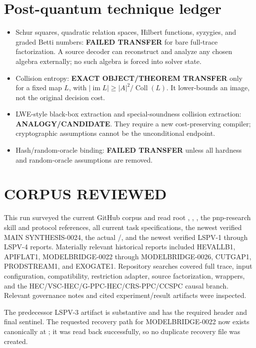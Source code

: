 \documentclass[11pt]{article}
\begin{document}
\section{Post-quantum technique ledger}
\begin{itemize}[leftmargin=*]
\item Schur squares, quadratic relation spaces, Hilbert functions, syzygies,
and graded Betti numbers: \textbf{FAILED TRANSFER} for bare full-trace
factorization.  A source decoder can reconstruct and analyze any chosen
algebra externally; no such algebra is forced into solver state.
\item Collision entropy: \textbf{EXACT OBJECT/THEOREM TRANSFER} only for a
fixed map $L$, with
$|\operatorname{im}L|\ge |A|^2/\operatorname{Coll}(L)$.  It lower-bounds an
image, not the original decision cost.
\item LWE-style black-box extraction and special-soundness collision
extraction: \textbf{ANALOGY/CANDIDATE}.  They require a new cost-preserving
compiler; cryptographic assumptions cannot be the unconditional endpoint.
\item Hash/random-oracle binding: \textbf{FAILED TRANSFER} unless all hardness
and random-oracle assumptions are removed.
\end{itemize}

\section{CORPUS REVIEWED}
This run surveyed the current GitHub corpus and read root ,
, , the pnp-research skill and protocol
references, all current task specifications, the newest verified MAIN
SYNTHESIS-0024, the actual /, and the newest
verified LSPV-1 through LSPV-4 reports.  Materially relevant historical reports
included HEVALLB1, APIFLAT1, MODELBRIDGE-0022 through MODELBRIDGE-0026, CUTGAP1,
PRODSTREAM1, and EXOGATE1.  Repository searches covered full trace, input
configuration, compatibility, restriction adapter, source factorization,
wrappers, and the HEC/VSC-HEC/G-PPC-HEC/CRS-PPC/CCSPC causal branch.  Relevant
governance notes and cited experiment/result artifacts were inspected.

The predecessor LSPV-3 artifact
 is
substantive and has the required header and final sentinel.  The requested
recovery path for MODELBRIDGE-0022 now exists canonically at
; it
was read back successfully, so no duplicate recovery file was created.
\end{document}
